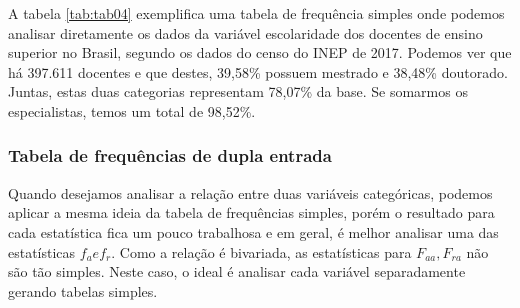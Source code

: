 \documentclass[12pt,]{style/krantz}
\makeatletter
\newenvironment{Shaded}{\begin{snugshade}}{\end{snugshade}}
\newcommand{\DataTypeTok}[1]{\textcolor[rgb]{0.13,0.29,0.53}{#1}}
\newcommand{\DecValTok}[1]{\textcolor[rgb]{0.00,0.00,0.81}{#1}}
\newcommand{\KeywordTok}[1]{\textcolor[rgb]{0.13,0.29,0.53}{\textbf{#1}}}
\newcommand{\NormalTok}[1]{#1}
\newcommand{\OperatorTok}[1]{\textcolor[rgb]{0.81,0.36,0.00}{\textbf{#1}}}
\newcommand{\OtherTok}[1]{\textcolor[rgb]{0.56,0.35,0.01}{#1}}
\newcommand{\StringTok}[1]{\textcolor[rgb]{0.31,0.60,0.02}{#1}}
\newenvironment{kframe}{%
\medskip{}
\setlength{\fboxsep}{.8em}
 \def\at@end@of@kframe{}%
 \ifinner\ifhmode%
  \def\at@end@of@kframe{\end{minipage}}%
  \begin{minipage}{\columnwidth}%
 \fi\fi%
 \def\FrameCommand##1{\hskip\@totalleftmargin \hskip-\fboxsep
 \colorbox{shadecolor}{##1}\hskip-\fboxsep
     \hskip-\linewidth \hskip-\@totalleftmargin \hskip\columnwidth}%
 \MakeFramed {\advance\hsize-\width
   \@totalleftmargin\z@ \linewidth\hsize
   \@setminipage}}%
 {\par\unskip\endMakeFramed%
 \at@end@of@kframe}
\renewenvironment{Shaded}{\begin{kframe}}{\end{kframe}}
\theoremstyle{definition}
\theoremstyle{definition}
\theoremstyle{definition}
\theoremstyle{remark}
\makeatother
\begin{document}
A tabela \ref{tab:tab04} exemplifica uma tabela de frequência simples onde podemos analisar diretamente os dados da variável escolaridade dos docentes de ensino superior no Brasil, segundo os dados do censo do INEP de 2017. Podemos ver que há 397.611 docentes e que destes, 39,58\% possuem mestrado e 38,48\% doutorado. Juntas, estas duas categorias representam 78,07\% da base. Se somarmos os especialistas, temos um total de 98,52\%.

\hypertarget{tabela-de-frequencias-de-dupla-entrada}{%
\subsubsection{Tabela de frequências de dupla entrada}\label{tabela-de-frequencias-de-dupla-entrada}}

Quando desejamos analisar a relação entre duas variáveis categóricas, podemos aplicar a mesma ideia da tabela de frequências simples, porém o resultado para cada estatística fica um pouco trabalhosa e em geral, é melhor analisar uma das estatísticas \(f_{a} e f_{r}\). Como a relação é bivariada, as estatísticas para \(F_{aa}, F_{ra}\) não são tão simples. Neste caso, o ideal é analisar cada variável separadamente gerando tabelas simples.

\begin{Shaded}
\end{Shaded}
\end{document}
